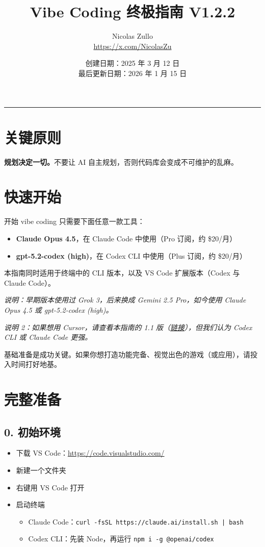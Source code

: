 \documentclass[12pt]{article}
\title{Vibe Coding 终极指南 V1.2.2}
\author{Nicolas Zullo \\ \href{https://x.com/NicolasZu}{https://x.com/NicolasZu}}
\date{创建日期：2025 年 3 月 12 日 \\ 最后更新日期：2026 年 1 月 15 日}
\begin{document}
\maketitle
\bigskip
\hrule
\bigskip

\section*{关键原则}
\textbf{规划决定一切。}不要让 AI 自主规划，否则代码库会变成不可维护的乱麻。

\section{快速开始}
开始 vibe coding 只需要下面任意一款工具：
\begin{itemize}
  \item \textbf{Claude Opus 4.5}，在 Claude Code 中使用（Pro 订阅，约 \$20/月）
  \item \textbf{gpt-5.2-codex (high)}，在 Codex CLI 中使用（Plus 订阅，约 \$20/月）
\end{itemize}
本指南同时适用于终端中的 CLI 版本，以及 VS Code 扩展版本（Codex 与 Claude Code）。

\textit{说明：早期版本使用过 Grok 3，后来换成 Gemini 2.5 Pro，如今使用 Claude Opus 4.5 或 gpt-5.2-codex (high)。}

\textit{说明 2：如果想用 Cursor，请查看本指南的 1.1 版（\href{https://github.com/EnzeD/vibe-coding/tree/1.1.1}{链接}），但我们认为 Codex CLI 或 Claude Code 更强。}

基础准备是成功关键。如果你想打造功能完备、视觉出色的游戏（或应用），请投入时间打好地基。

\section{完整准备}
\subsection{0. 初始环境}
\begin{itemize}
  \item 下载 VS Code：\href{https://code.visualstudio.com/}{https://code.visualstudio.com/}
  \item 新建一个文件夹
  \item 右键用 VS Code 打开
  \item 启动终端
  \begin{itemize}
    \item Claude Code：\texttt{curl -fsSL https://claude.ai/install.sh | bash}
    \item Codex CLI：先装 Node，再运行 \texttt{npm i -g @openai/codex}
  \end{itemize}
\end{itemize}
\end{document}
